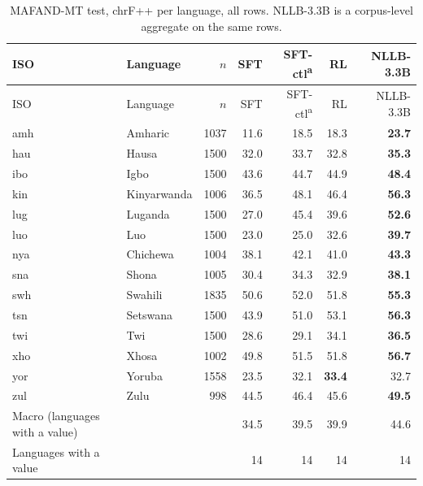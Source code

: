 {\footnotesize\setlength{\tabcolsep}{3pt}
\begin{longtable}{@{}llrrrrr@{}}
\caption{MAFAND-MT test, chrF++ per language, all rows. NLLB-3.3B is a corpus-level aggregate on the same rows.}\label{tab:full-mafand-chrfpp}\\
\toprule
ISO & Language & $n$ & SFT & SFT-ctl\textsuperscript{a} & RL & NLLB-3.3B \\
\midrule\endfirsthead
\toprule
ISO & Language & $n$ & SFT & SFT-ctl\textsuperscript{a} & RL & NLLB-3.3B \\
\midrule\endhead
\midrule\endfoot
\bottomrule\endlastfoot
amh & Amharic & 1037 & 11.6 & 18.5 & 18.3 & \textbf{23.7} \\
hau & Hausa & 1500 & 32.0 & 33.7 & 32.8 & \textbf{35.3} \\
ibo & Igbo & 1500 & 43.6 & 44.7 & 44.9 & \textbf{48.4} \\
kin & Kinyarwanda & 1006 & 36.5 & 48.1 & 46.4 & \textbf{56.3} \\
lug & Luganda & 1500 & 27.0 & 45.4 & 39.6 & \textbf{52.6} \\
luo & Luo & 1500 & 23.0 & 25.0 & 32.6 & \textbf{39.7} \\
nya & Chichewa & 1004 & 38.1 & 42.1 & 41.0 & \textbf{43.3} \\
sna & Shona & 1005 & 30.4 & 34.3 & 32.9 & \textbf{38.1} \\
swh & Swahili & 1835 & 50.6 & 52.0 & 51.8 & \textbf{55.3} \\
tsn & Setswana & 1500 & 43.9 & 51.0 & 53.1 & \textbf{56.3} \\
twi & Twi & 1500 & 28.6 & 29.1 & 34.1 & \textbf{36.5} \\
xho & Xhosa & 1002 & 49.8 & 51.5 & 51.8 & \textbf{56.7} \\
yor & Yoruba & 1558 & 23.5 & 32.1 & \textbf{33.4} & 32.7 \\
zul & Zulu & 998 & 44.5 & 46.4 & 45.6 & \textbf{49.5} \\
\midrule
Macro (languages with a value) & & & 34.5 & 39.5 & 39.9 & 44.6 \\
Languages with a value & & & 14 & 14 & 14 & 14 \\
\end{longtable}}

